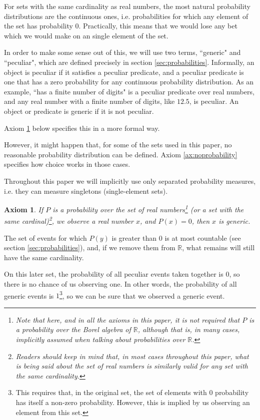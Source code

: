 \documentclass[a4paper
,draft
]{article}
\def\reale{\mathbb{R}}
\newcommand{\paper}[1]{paper}
\newcommand{\ghilimele}[1]{``#1"}
\newtheorem{axiom}{Axiom}
\begin{document}
For sets with the same cardinality as real numbers,
the most natural probability distributions are the continuous
ones, i.e. probabilities for which any element of the set has probability $0$.
Practically, this means that we would lose any bet which we would make on an
single element of the set.

In order to make some sense out of this, we will use two terms,
\ghilimele{generic} and \ghilimele{peculiar},
which are defined precisely in section \ref{sec:probabilities}.
Informally,
an object is peculiar if it satisfies a peculiar predicate, and a peculiar
predicate is one that has a zero probability for any continuous probability
distribution.
As an example,
\ghilimele{has a finite number of digits} is a peculiar
predicate over real numbers, and any real number with a finite number
of digits, like $12.5$, is peculiar. An object or predicate is generic if
it is not peculiar.

Axiom \ref{ax:zeroisgeneric} below specifies this in a more formal way.

However, it might happen that, for some of the sets used in this \paper{},
no reasonable probability distribution can be defined.
Axiom \ref{ax:noprobability} specifies how choice works in those cases.

Throughout this paper we will implicitly use only separated probability
measures, i.e. they can measure singletons (single-element sets).

\begin{axiom}
  \label{ax:zeroisgeneric}
  If $P$ is a probability over the set of real numbers\footnote{Note
    that here, and in all the axioms in this paper, it is not required that
    $P$ is a probability over the
    Borel algebra of $\reale$, although that is, in many cases, implicitly
    assumed when talking about probabilities over $\reale$.
  }
  (or a set with the same cardinal)\footnote{
    Readers should
    keep in mind that, in most cases throughout this paper, what is being said
    about the set of real numbers is similarly valid for any set with the same
    cardinality.},
  we observe a real number $x$, and $P(x)=0$, then $x$ is generic.
\end{axiom}

The set of events for which $P(y)$ is
greater than $0$ is at most countable (see section \ref{sec:probabilities}),
and, if we remove them from $\reale$, what remains will still have
the same cardinality.

On this later set, the probability
of all peculiar events taken together is $0$, so there is no chance of us
observing one.
In other words, the probability of all generic events is $1$\footnote{This
  requires that, in the original set, the set of elements with $0$ probability
  has itself a non-zero probability. However, this is implied by us observing
  an element from this set.
},
so we can be sure that we observed a generic event.
\end{document}

